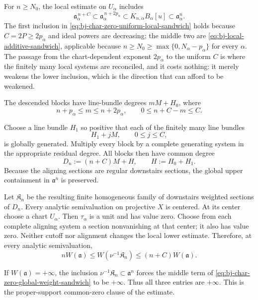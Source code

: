 For $n\ge N_0$, the local estimate on $U_\alpha$ includes
\[
 \mathfrak a_\alpha^{\,n+C}
 \subset\mathfrak a_\alpha^{\,n+2p_\alpha}
 \subset K_{n,\alpha}B_\alpha[u]
 \subset\mathfrak a_\alpha^n.
\tag{44.21}\label{eq:bj-char-zero-uniform-local-sandwich}
\]
The first inclusion in \eqref{eq:bj-char-zero-uniform-local-sandwich} holds
because $C=2P\ge2p_\alpha$ and ideal powers are decreasing; the middle two
are \eqref{eq:bj-local-additive-sandwich}, applicable because
$n\ge N_0\ge\max\{0,N_\alpha-p_\alpha\}$ for every $\alpha$.  The
passage from the chart-dependent exponent $2p_\alpha$ to the uniform
$C$ is where the finitely many local systems are reconciled, and it costs
nothing: it merely weakens the lower inclusion, which is the direction that
can afford to be weakened.

The descended blocks have line-bundle degrees $mM+H_0$, where
\[
       n+p_\alpha\le m\le n+2p_\alpha,
       \qquad
       0\le n+C-m\le C.
\tag{44.22}\label{eq:bj-char-zero-block-degrees}
\]

Choose a line bundle $H_1$ so positive that each of the finitely many line
bundles
\[
                         H_1+jM,\qquad0\le j\le C,
\]
is globally generated.
Multiply every block by a complete generating system in the appropriate
residual degree.
All blocks then have common degree
\[
                         D_n:=(n+C)M+H,
             \qquad
                         H:=H_0+H_1.
\tag{44.23}\label{eq:bj-char-zero-aligned-degree}
\]
Because the aligning sections are regular downstairs sections, the global
upper containment in $\mathfrak a^n$ is preserved.

Let $\mathfrak K_n$ be the resulting finite homogeneous family of
downstairs weighted sections of $D_n$.
Every analytic semivaluation on projective $X$ is centered.
At its center choose a chart $U_\alpha$.
Then $\tau_\alpha$ is a unit and has value zero.
Choose from each complete aligning system a section nonvanishing at that
center; it also has value zero.
Neither cutoff nor alignment changes the local lower estimate.
Therefore, at every analytic semivaluation,
\[
       nW(\mathfrak a)
       \le W(\nu^{-1}\mathfrak K_n)
       \le(n+C)W(\mathfrak a).
\tag{44.24}\label{eq:bj-char-zero-global-weight-sandwich}
\]

If $W(\mathfrak a)=+\infty$, the inclusion
$\nu^{-1}\mathfrak K_n\subset\mathfrak a^n$ forces the middle term of
\eqref{eq:bj-char-zero-global-weight-sandwich} to be $+\infty$.
Thus all three entries are $+\infty$.
This is the proper-support common-zero clause of the estimate.

